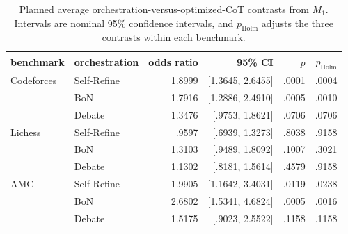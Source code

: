 \begin{table}[H]
\centering
\footnotesize
\setlength{\tabcolsep}{4pt}
\caption{Planned average orchestration-versus-optimized-CoT contrasts from $M_1$.
Intervals are nominal 95\% confidence intervals, and $p_{\mathrm{Holm}}$ adjusts the three contrasts within each benchmark.}
\label{tab:average-method-contrasts}
\begin{tabular}{@{}llrrrr@{}}
\toprule
benchmark & orchestration & odds ratio & 95\% CI & $p$ & $p_{\mathrm{Holm}}$ \\
\midrule
Codeforces & Self-Refine & 1.8999 & [1.3645, 2.6455] & .0001 & .0004 \\
 & BoN & 1.7916 & [1.2886, 2.4910] & .0005 & .0010 \\
 & Debate & 1.3476 & [.9753, 1.8621] & .0706 & .0706 \\
\midrule
Lichess & Self-Refine & .9597 & [.6939, 1.3273] & .8038 & .9158 \\
 & BoN & 1.3103 & [.9489, 1.8092] & .1007 & .3021 \\
 & Debate & 1.1302 & [.8181, 1.5614] & .4579 & .9158 \\
\midrule
AMC & Self-Refine & 1.9905 & [1.1642, 3.4031] & .0119 & .0238 \\
 & BoN & 2.6802 & [1.5341, 4.6824] & .0005 & .0016 \\
 & Debate & 1.5175 & [.9023, 2.5522] & .1158 & .1158 \\
\bottomrule
\end{tabular}
\end{table}

